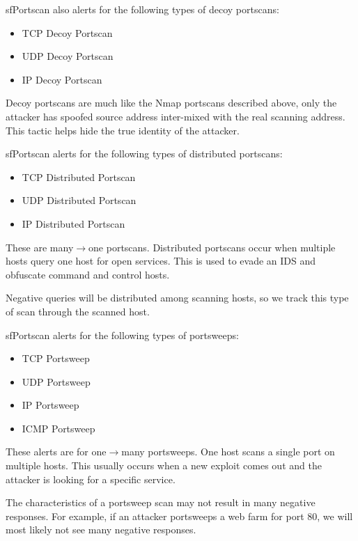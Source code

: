 \documentclass[english]{report}
\newenvironment{note}{
\samepage
    \vspace{10pt}{\textsf{
        {\hspace{7pt}\Huge{$\triangle$\hspace{-12.5pt}{\Large{$^!$}}}}\hspace{5pt}
        {\Large{NOTE}}
    }
    }
   \begin{center}
    \par\vspace{-17pt}

    \begin{lrbox}{\savepar}
    \begin{minipage}[r]{6in}
}
{
    \end{minipage}
    \end{lrbox}
    \fbox{
        \usebox{
            \savepar
        }
    }
    \par\vskip10pt
    \end{center}
}
\begin{document}
sfPortscan also alerts for the following types of decoy portscans:
\begin{itemize}
\item TCP Decoy Portscan
\item UDP Decoy Portscan
\item IP Decoy Portscan
\end{itemize}

Decoy portscans are much like the Nmap portscans described above, only the attacker has spoofed
source address inter-mixed with the real scanning address. This tactic
helps hide the true identity of the attacker.

sfPortscan alerts for the following types of distributed portscans:
\begin{itemize}
\item TCP Distributed Portscan
\item UDP Distributed Portscan
\item IP Distributed Portscan
\end{itemize}

These are many$\rightarrow$one portscans. Distributed portscans occur when
multiple hosts query one host for open services. This is used to evade
an IDS and obfuscate command and control hosts.

\begin{note}
Negative queries will be distributed among scanning hosts, so
we track this type of scan through the scanned host.
\end{note}

sfPortscan alerts for the following types of portsweeps:
\begin{itemize}
\item TCP Portsweep
\item UDP Portsweep
\item IP Portsweep
\item ICMP Portsweep
\end{itemize}

These alerts are for one$\rightarrow$many portsweeps. One host scans a single port
on multiple hosts. This usually occurs when a new exploit comes out and the
attacker is looking for a specific service. 

\begin{note}
The characteristics of a portsweep scan may not result in many
negative responses. For example, if an attacker portsweeps a web farm
for port 80, we will most likely not see many negative responses.
\end{note}
\end{document}
